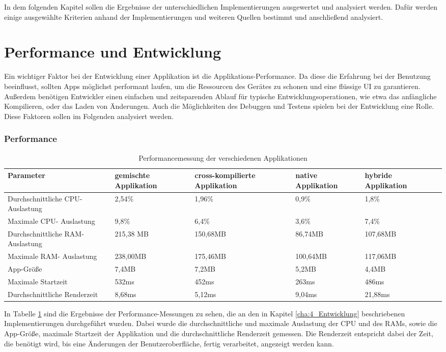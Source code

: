 In dem folgenden Kapitel sollen die Ergebnisse der unterschiedlichen Implementierungen ausgewertet und analysiert werden. Dafür werden einige ausgewählte Kriterien anhand der Implementierungen und weiteren Quellen bestimmt und anschließend analysiert.

\section{Performance und Entwicklung}
Ein wichtiger Faktor bei der Entwicklung einer Applikation ist die Applikations-Performance. Da diese die Erfahrung bei der Benutzung beeinflusst, sollten Apps möglichst performant laufen, um die Ressourcen des Gerätes zu schonen und eine flüssige UI zu garantieren. Außerdem benötigen Entwickler einen einfachen und zeitsparenden Ablauf für typische Entwicklungsoperationen, wie etwa das anfängliche Kompilieren, oder das Laden von Änderungen. Auch die Möglichkeiten des Debuggen und Testens spielen bei der Entwicklung eine Rolle. Diese Faktoren sollen im Folgenden analysiert werden.

\subsubsection{Performance}

\begin{table}[ht]
\centering
\caption{Performancemessung der verschiedenen Applikationen}
\begin{tabular}{ |p{4cm}||p{3cm}|p{2.5cm}|p{2.5cm}|p{2.5cm}|p{2.5cm}| }
 \hline
 Parameter & gemischte Applikation & cross-kompilierte Applikation & native Applikation & hybride Applikation \\
 \hline
 Durchschnittliche CPU-Auslastung       &   2,54\%&   1,96\%& 0,9\%& 1,8\%\\
  \hline
 Maximale CPU- Auslastung  & 9,8\%& 6,4\%& 3,6\%& 7,4\%\\
  \hline
 Durchschnittliche RAM-Auslastung & 215,38 MB& 150,68MB& 86,74MB& 107,68MB\\
  \hline
 Maximale RAM- Auslastung & 238,00MB& 175,46MB& 100,64MB& 117,06MB\\
  \hline
 App-Größe & 7,4MB& 7,2MB& 5,2MB& 4,4MB\\
  \hline
 Maximale Startzeit & 532ms& 452ms& 263ms& 486ms\\
 \hline
 Durchschnittliche Renderzeit &8,68ms& 5,12ms& 9,04ms& 21,88ms\\
 \hline
\end{tabular}
\label{tab:evaluations_performance}
\end{table}
\newpage
In Tabelle \ref{tab:evaluations_performance} sind die Ergebnisse der Performance-Messungen zu sehen, die an den in Kapitel \ref{cha:4_Entwicklung} beschriebenen Implementierungen durchgeführt wurden. Dabei wurde die durchschnittliche und maximale Auslastung der CPU und des RAMs, sowie die App-Größe, maximale Startzeit der Applikation und die durchschnittliche Renderzeit gemessen. 
Die Renderzeit entspricht dabei der Zeit, die benötigt wird, bis eine Änderungen der Benutzeroberfläche, fertig verarbeitet, angezeigt werden kann.

